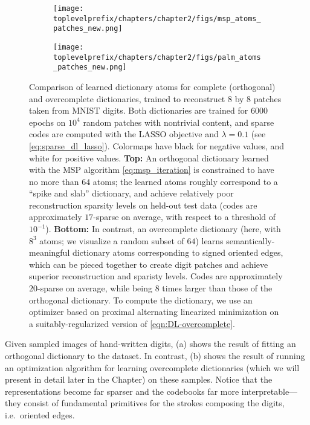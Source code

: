 \documentclass[../../book-main.tex]{subfiles}
\begin{document}
\begin{figure}[t]
\centering
    \begin{subfigure}{0.9\linewidth}
        \centering
        \texttt{[image: \\toplevelprefix/chapters/chapter2/figs/msp\_atoms\_patches\_new.png]}
        \caption{}
    \end{subfigure}
    \begin{subfigure}{0.9\linewidth}
        \centering
        \texttt{[image: \\toplevelprefix/chapters/chapter2/figs/palm\_atoms\_patches\_new.png]}
        \caption{}
    \end{subfigure}
    \caption{Comparison of learned dictionary atoms for complete (orthogonal)
    and overcomplete dictionaries, trained to reconstruct $8$ by $8$ patches taken from
    MNIST digits. Both dictionaries are trained for $6000$ epochs on $10^4$ random patches with
    nontrivial content, and sparse codes are computed with the LASSO objective
    and $\lambda=0.1$ (see \eqref{eq:sparse_dl_lasso}). Colormaps have black for negative values, and white for
    positive values. \textbf{Top:} An orthogonal dictionary learned with the
    MSP algorithm \eqref{eq:msp_iteration} is constrained to
    have no more than $64$ atoms; the learned atoms roughly correspond to
    a ``spike and slab'' dictionary, and achieve relatively poor reconstruction sparsity
    levels on held-out test data (codes are approximately $17$-sparse on
    average, with respect to a threshold of $10^{-1}$).
    \textbf{Bottom:} In contrast, an overcomplete dictionary (here, with $8^3$
    atoms; we visualize a random subset of $64$) learns
    semantically-meaningful dictionary atoms corresponding to signed oriented
    edges, which can be pieced together to create digit patches and achieve
    superior reconstruction and sparisty levels. Codes are approximately
    $20$-sparse on
    average, while being $8$ times larger than those of the orthogonal
    dictionary. To compute the
    dictionary, we use an optimizer based on proximal alternating linearized
    minimization on a suitably-regularized version of
    \eqref{eqn:DL-overcomplete}.}
    \label{fig:ReconMNIST}
\end{figure}

\begin{example}
Given sampled images of hand-written digits, (a) shows the result of fitting an orthogonal dictionary to the dataset. 
In contrast, (b) shows the result of running an
optimization algorithm for learning overcomplete dictionaries (which we will
present in detail later in the Chapter) on these samples. 
Notice that the representations become far sparser and the codebooks far more interpretable---they consist of fundamental primitives for the strokes composing the digits, i.e.\ oriented edges.
\end{example}
\end{document}

